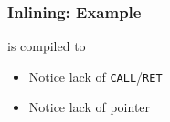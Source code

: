 \begin{frame}
  \frametitle{Inlining: Example}
  \begin{center}
    is compiled to
  \end{center}
  \begin{itemize}
    \item Notice lack of \texttt{CALL}/\texttt{RET}
    \item Notice lack of pointer
  \end{itemize}
\end{frame}



